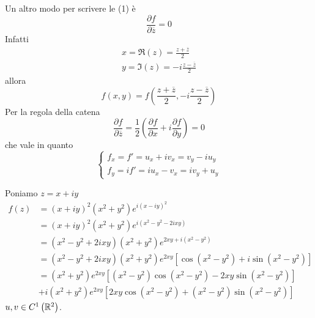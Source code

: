 \begin{rem}
Un altro modo per scrivere le (1) è
\begin{equation*}
\frac{\partial f}{\partial \overline{z}} = 0
\end{equation*}
Infatti
\begin{equation*}
\begin{array}{ l }
x = \Re \left(z\right) = \frac{z + \overline{z}}{2}\\
y = \Im \left(z\right) = - i\frac{z - \overline{z}}{2}
\end{array}
\end{equation*}
allora
\begin{equation*}
f\left(x,y\right) = f\left(\frac{z + \overline{z}}{2} , - i\frac{z - \overline{z}}{2}\right)
\end{equation*}
Per la regola della catena
\begin{equation*}
\frac{\partial f}{\partial \overline{z}} = \frac{1}{2}\left(\frac{\partial f}{\partial x} + i\frac{\partial f}{\partial y}\right) = 0
\end{equation*}
che vale in quanto
\begin{equation*}
\begin{cases}
f_{x} = f' = u_{x} + iv_{x} = v_{y} - iu_{y}\\
f_{y} = if' = iu_{x} - v_{x} = iv_{y} + u_{y}
\end{cases}
\end{equation*}
\end{rem}
Poniamo $z = x + iy$
\begin{align*}
f\left(z\right) & = \left(x + iy\right)^{2}\left(x^{2} + y^{2}\right) e^{i\left(x - iy\right)^{2}}\\
 & = \left(x + iy\right)^{2}\left(x^{2} + y^{2}\right) e^{i\left(x^{2} - y^{2} - 2ixy\right)}\\
 & = \left(x^{2} - y^{2} + 2ixy\right)\left(x^{2} + y^{2}\right) e^{2xy + i\left(x^{2} - y^{2}\right)}\\
 & = \left(x^{2} - y^{2} + 2ixy\right)\left(x^{2} + y^{2}\right) e^{2xy}\left[\cos\left(x^{2} - y^{2}\right) + i\sin\left(x^{2} - y^{2}\right)\right]\\
 & = \left(x^{2} + y^{2}\right) e^{2xy}\left[\left(x^{2} - y^{2}\right)\cos\left(x^{2} - y^{2}\right) - 2xy\sin\left(x^{2} - y^{2}\right)\right]\\
 & + i\left(x^{2} + y^{2}\right) e^{2xy}\left[ 2xy\cos\left(x^{2} - y^{2}\right) + \left(x^{2} - y^{2}\right)\sin\left(x^{2} - y^{2}\right)\right]
\end{align*}
$u,v\in C^{1}\left(\mathbb{R} ^{2}\right)$.


